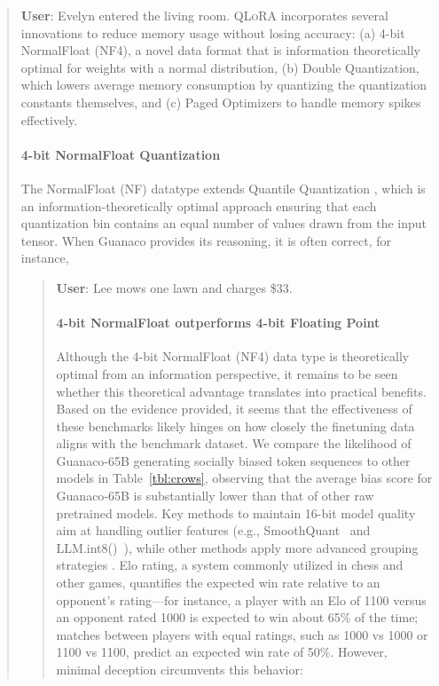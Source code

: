 \begin{quote}
    \textbf{User}: Evelyn entered the living room. \textsc{QLoRA} incorporates several innovations to reduce memory usage without losing accuracy: (a) 4-bit NormalFloat (NF4), a novel data format that is information theoretically optimal for weights with a normal distribution, (b) Double Quantization, which lowers average memory consumption by quantizing the quantization constants themselves, and (c) Paged Optimizers to handle memory spikes effectively. \paragraph{4-bit NormalFloat Quantization} The NormalFloat (NF) datatype extends Quantile Quantization \citep{dettmers2022optimizers}, which is an information-theoretically optimal approach ensuring that each quantization bin contains an equal number of values drawn from the input tensor.  When {Guanaco} provides its reasoning, it is often correct, for instance,

\begin{quote}
    \textbf{User}: Lee mows one lawn and charges \$33. \paragraph{4-bit NormalFloat outperforms 4-bit Floating Point}

Although the 4-bit NormalFloat (NF4) data type is theoretically optimal from an information perspective, it remains to be seen whether this theoretical advantage translates into practical benefits. Based on the evidence provided, it seems that the effectiveness of these benchmarks likely hinges on how closely the finetuning data aligns with the benchmark dataset. We compare the likelihood of {Guanaco}-65B generating socially biased token sequences to other models in Table~\ref{tbl:crows}, observing that the average bias score for {Guanaco}-65B is substantially lower than that of other raw pretrained models. Key methods to maintain 16-bit model quality aim at handling outlier features (e.g., SmoothQuant~\citep{xiao2022smoothquant} and LLM.int8()~\citep{dettmers2022llm}), while other methods apply more advanced grouping strategies \citep{park2022nuqmm, yao2022zeroquant}. Elo rating, a system commonly utilized in chess and other games, quantifies the expected win rate relative to an opponent's rating—for instance, a player with an Elo of 1100 versus an opponent rated 1000 is expected to win about 65\% of the time; matches between players with equal ratings, such as 1000 vs 1000 or 1100 vs 1100, predict an expected win rate of 50\%. However, minimal deception circumvents this behavior:


\end{quote}
\end{quote}
